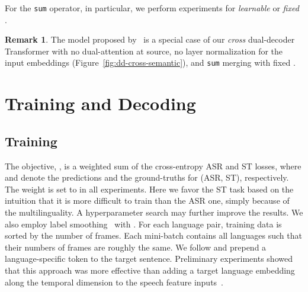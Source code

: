 \documentclass[11pt]{article}
\theoremstyle{plain}
\theoremstyle{definition}
\newtheorem*{remark}{Remark}
\newcommand{\var}[1]{\texttt{#1}}
\begin{document}
For the \var{sum} operator, in particular, we perform experiments for \emph{learnable} or \emph{fixed} .

\begin{remark}
The model proposed by~ is a special case of our \emph{cross} dual-decoder Transformer with no dual-attention at source, no layer normalization for the input embeddings (Figure~\ref{fig:dd-cross-semantic}), and \var{sum} merging with fixed .

\end{remark}





\section{Training and Decoding}


\subsection{Training}
\label{sec:training-methods}


The objective, , is a weighted sum of the cross-entropy ASR and ST losses,
where  and  denote the predictions and the ground-truths for (ASR, ST), respectively. The weight  is set to  in all experiments. Here we favor the ST task based on the intuition that it is more difficult to train than the ASR one, simply because of the multilinguality. A hyperparameter search may further improve the results. We also employ label smoothing~\cite{szegedy2016rethinking} with . For each language pair, training data is sorted by the number of frames. Each mini-batch contains all languages such that their numbers of frames are roughly the same. We follow  and prepend a language-specific token to the target sentence. Preliminary experiments showed that this approach was more effective than adding a target language embedding along the temporal dimension to the speech feature inputs~\cite{di2019must}.
\end{document}
